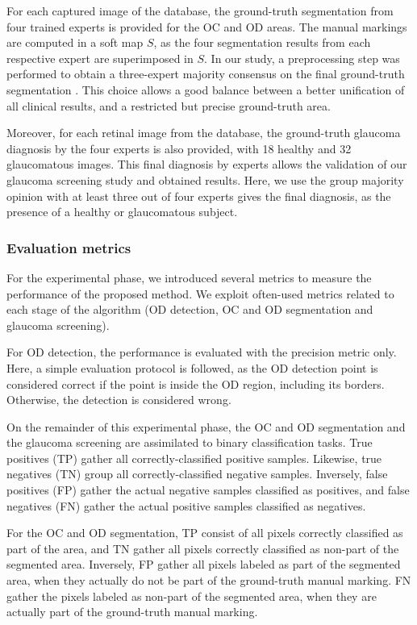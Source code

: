 For each captured image of the database, the ground-truth segmentation from four trained experts is provided for the OC and OD areas. The manual markings are computed in a soft map $S$, as the four segmentation results from each respective expert are superimposed in $S$. In our study, a preprocessing step was performed to obtain a three-expert majority consensus on the final ground-truth segmentation \citep{drishti}. This choice allows a good balance between a better unification of all clinical results, and a restricted but precise ground-truth area.

Moreover, for each retinal image from the database, the ground-truth glaucoma diagnosis by the four experts is also provided, with 18 healthy and 32 glaucomatous images. This final diagnosis by experts allows the validation of our glaucoma screening study and obtained results. Here, we use the group majority opinion with at least three out of four experts gives the final diagnosis, as the presence of a healthy or glaucomatous subject.

\subsubsection{\label{metrics3}Evaluation metrics}

For the experimental phase, we introduced several metrics to measure the performance of the proposed method. We exploit often-used metrics related to each stage of the algorithm (OD detection, OC and OD segmentation and glaucoma screening).

For OD detection, the performance is evaluated with the precision metric only. Here, a simple evaluation protocol is followed, as the OD detection point is considered correct if the point is inside the OD region, including its borders. Otherwise, the detection is considered wrong.

On the remainder of this experimental phase, the OC and OD segmentation and the glaucoma screening are assimilated to binary classification tasks. True positives (TP) gather all correctly-classified positive samples. Likewise, true negatives (TN) group all correctly-classified negative samples. Inversely, false positives (FP) gather the actual negative samples classified as positives, and false negatives (FN) gather the actual positive samples classified as negatives.

For the OC and OD segmentation, TP consist of all pixels correctly classified as part of the area, and TN gather all pixels correctly classified as non-part of the segmented area. Inversely, FP gather all pixels labeled as part of the segmented area, when they actually do not be part of the ground-truth manual marking. FN gather the pixels labeled as non-part of the segmented area, when they are actually part of the ground-truth manual marking.

